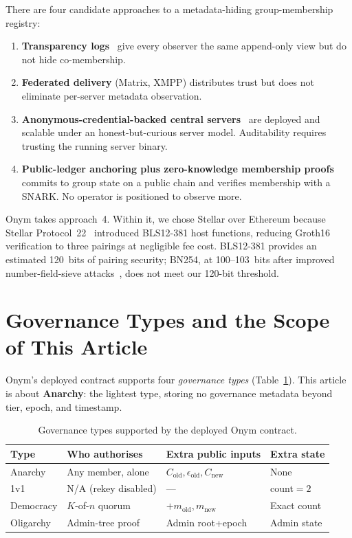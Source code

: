 \documentclass[journal]{IEEEtran}
\begin{document}
There are four candidate approaches to a metadata-hiding group-membership registry:
\begin{enumerate}
\item \textbf{Transparency logs}~\cite{laurie2013ct,melara2015coniks} give every observer the same append-only view but do not hide co-membership.
\item \textbf{Federated delivery} (Matrix, XMPP) distributes trust but does not eliminate per-server metadata observation.
\item \textbf{Anonymous-credential-backed central servers}~\cite{chase2020signal} are deployed and scalable under an honest-but-curious server model. Auditability requires trusting the running server binary.
\item \textbf{Public-ledger anchoring plus zero-knowledge membership proofs} commits to group state on a public chain and verifies membership with a SNARK. No operator is positioned to observe more.
\end{enumerate}

Onym takes approach~4. Within it, we chose Stellar over Ethereum because Stellar Protocol~22~\cite{sdf2024cap0046} introduced BLS12-381 host functions, reducing Groth16 verification to three pairings at negligible fee cost. BLS12-381 provides an estimated 120~bits of pairing security; BN254, at 100--103~bits after improved number-field-sieve attacks~\cite{barbulescu2019}, does not meet our 120-bit threshold.

\section{Governance Types and the Scope of This Article}

Onym's deployed contract supports four \emph{governance types} (Table~\ref{tab:governance}). This article is about \textbf{Anarchy}: the lightest type, storing no governance metadata beyond tier, epoch, and timestamp.

\begin{table}[t]
\centering
\caption{Governance types supported by the deployed Onym contract.}
\label{tab:governance}
\begin{tabular}{@{}p{1.3cm}p{2.8cm}p{1.8cm}p{1.2cm}@{}}
\toprule
\textbf{Type} & \textbf{Who authorises} & \textbf{Extra public inputs} & \textbf{Extra state} \\
\midrule
Anarchy & Any member, alone & $C_\text{old}, \epsilon_\text{old}, C_\text{new}$ & None \\
1v1 & N/A (rekey disabled) & --- & count${}=2$ \\
Democracy & $K$-of-$n$ quorum & $+m_\text{old}, m_\text{new}$ & Exact count \\
Oligarchy & Admin-tree proof & Admin root+epoch & Admin state \\
\bottomrule
\end{tabular}
\end{table}
\end{document}
